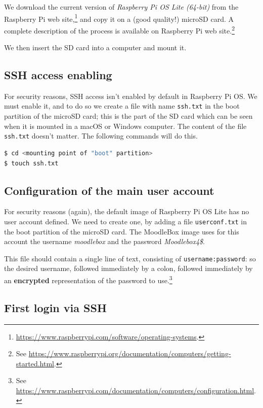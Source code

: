 \documentclass[12pt]{article}
\begin{document}
We download the current version of \emph{Raspberry Pi OS Lite (64-bit)} from the Raspberry Pi web site,\footnote{\url{https://www.raspberrypi.com/software/operating-systems}.} and copy it on a (good quality!) microSD card.
A complete description of the process is available on Raspberry Pi web site.\footnote{See \url{https://www.raspberrypi.org/documentation/computers/getting-started.html}.}

We then insert the SD card into a computer and mount it.

\subsection{SSH access enabling}

For security reasons, SSH access isn't enabled by default in Raspberry Pi OS.
We must enable it, and to do so we create a file with name \lstinline{ssh.txt} in the boot partition of the microSD card; this is the part of the SD card which can be seen when it is mounted in a macOS or Windows computer.
The content of the file \lstinline{ssh.txt} doesn't matter.
The following commands will do this.

\begin{lstlisting}[language=bash]
$ cd <mounting point of "boot" partition>
$ touch ssh.txt
\end{lstlisting}

\subsection{Configuration of the main user account}\label{ssec-new-account}

For security reasons (again), the default image of Raspberry Pi OS Lite has no user account defined.
We need to create one, by adding a file \lstinline{userconf.txt} in the boot partition of the microSD card.
The MoodleBox image uses for this account the username \emph{moodlebox} and the password \emph{Moodlebox4\$}.

This file should contain a single line of text, consisting of \lstinline{username:password}: so the desired username, followed immediately by a colon, followed immediately by an \textbf{encrypted} representation of the password to use.\footnote{See \url{https://www.raspberrypi.com/documentation/computers/configuration.html}.}

\subsection{First login via SSH}
\end{document}
